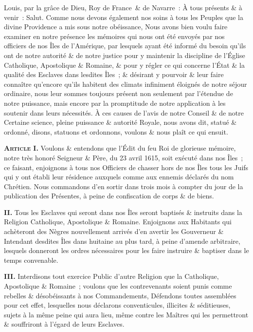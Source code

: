 \documentclass[twoside]{book} %
\newcommand{\labelchar}[1]{\textbf{\color{rubric} #1}}
\begin{document}
\noindent Louis, par la grâce de Dieu, Roy de France \& de Navarre : À tous présents \& à venir : Salut. Comme nous devons également nos soins à tous les Peuples que la divine Providence a mis sous notre obéissance, Nous avons bien voulu faire examiner en notre présence les mémoires qui nous ont été envoyés par nos officiers de nos Îles de l’Amérique, par lesquels ayant été informé du besoin qu’ils ont de notre autorité \& de notre justice pour y maintenir la discipline de l’Église Catholique, Apostolique \& Romaine, \& pour y régler ce qui concerne l’État \& la qualité des Esclaves dans lesdites Îles ; \& désirant y pourvoir \& leur faire connaître qu’encore qu’ils habitent des climats infiniment éloignés de notre séjour ordinaire, nous leur sommes toujours présent non seulement par l’étendue de notre puissance, mais encore par la promptitude de notre application à les soutenir dans leurs nécessités. À ces causes de l’avis de notre Conseil \& de notre Certaine science, pleine puissance \& autorité Royale, nous avons dit, statué \& ordonné, disons, statuons et ordonnons, voulons \& nous plaît ce qui ensuit.\par
\bigbreak
\labelchar{{\scshape Article} I.} Voulons \& entendons que l’Édit du feu Roi de glorieuse mémoire, notre très honoré Seigneur \& Père, du 23 avril 1615, soit exécuté dans nos Îles ; ce faisant, enjoignons à tous nos Officiers de chasser hors de nos Îles tous les Juifs qui y ont établi leur résidence auxquels comme aux ennemis déclarés du nom Chrétien. Nous commandons d’en sortir dans trois mois à compter du jour de la publication des Présentes, à peine de confiscation de corps \& de biens.\par
\labelchar{II.} Tous les Esclaves qui seront dans nos Îles seront baptisés \& instruits dans la Religion Catholique, Apostolique \& Romaine. Enjoignons aux Habitants qui achèteront des Nègres nouvellement arrivés d’en avertir les Gouverneur \& Intendant desdites Îles dans huitaine au plus tard, à peine d’amende arbitraire, lesquels donneront les ordres nécessaires pour les faire instruire \& baptiser dans le temps convenable.\par
\labelchar{III.} Interdisons tout exercice Public d’autre Religion que la Catholique, Apostolique \& Romaine ; voulons que les contrevenants soient punis comme rebelles \& désobéissants à nos Commandements, Défendons toutes assemblées pour cet effet, lesquelles nous déclarons conventicules, illicites \& séditieuses, sujets à la même peine qui aura lieu, même contre les Maîtres qui les permettront \& souffriront à l’égard de leurs Esclaves.\par
\end{document}
